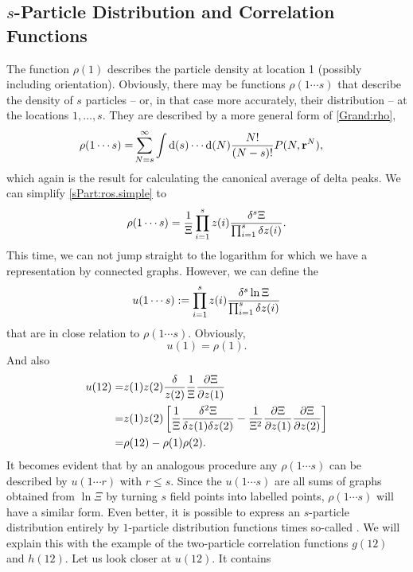 \documentclass[8.5pt,twoside,twocolumn]{article}
\newcommand\di{\te{d}}
\renewcommand\r{\bo r}
\theoremstyle{standard}
\begin{document}
\newcommand\os{1,\ldots,s}
\newcommand\ros{\rho(1\cdots s)}
\newcommand\uos{u(1\cdots s)}
\subsection{$s$-Particle Distribution and Correlation Functions}
\label{MCE:sPart} 
The function $\rho(1)$ describes the particle density at location 1 (possibly including
orientation). Obviously, there may be functions $\ros$ that describe the density of
$s$ particles -- or, in that case more accurately, their distribution -- at the
locations $\os$. They are described by a more general form of \eqref{Grand:rho},
\begin{equation}
\begin{aligned}
\ros%
=&\sum_{N=s}^{\infty} \int\di(s)\cdots\di(N) \frac{N!}{(N-s)!}P(N,\r^N),
\end{aligned}
\label{sPart:ros.simple}
\end{equation}
which again is the result for calculating the canonical average of delta peaks. We can simplify
\eqref{sPart:ros.simple} to
\begin{equation}
\ros=\frac 1 \Xi \prod_{i=1}^s z(i) \frac{\dl^s\Xi}{\prod_{i=1}^s \dl z(i)}.
\label{sPart:ros.byXi}
\end{equation} 
This time, we can not jump straight to the logarithm for which we have a representation by connected
graphs. However, we can define the  
\begin{equation}
\uos:=\prod_{i=1}^s z(i) \frac{\dl^s \ln \Xi}{\prod_{i=1}^s \dl z(i)}
\end{equation}
that are in close relation to $\ros$. Obviously,
\begin{equation}
u(1)=\rho(1).
\end{equation}
And also
\newcommand\ut{u(12)}
\newcommand\rot{\rho(12)}
\newcommand\g{g(12)}
\renewcommand\h{h(12)}
\begin{equation}
\begin{aligned}
\ut=&z(1)z(2)\frac\dl{z(2)} \frac 1 \Xi \deri{\Xi}{z(1)}\\
=&z(1)z(2)\ed{\frac 1 \Xi \frac{\dl^2 \Xi}{\dl z(1) \dl z(2)} - \frac 1 {\Xi^2} \deri{\Xi}{z(1)} \deri{\Xi}{z(2)}}\\
=&\rot - \rho(1)\rho(2).
\end{aligned}
\end{equation}
It becomes evident that by an analogous procedure any $\ros$ can be described by $u(1\cdots r)$ with $r\le s$.
Since the $\uos$ are all sums of graphs obtained from $\ln \Xi$ by turning $s$ field points into labelled points,
$\ros$ will have a similar form. Even better, it is possible to express an $s$-particle distribution
entirely by $1$-particle distribution functions times so-called . We will explain this
with the example of the two-particle correlation functions $\g$ and $\h$. Let us look closer at $\ut$. It contains
\end{document}
